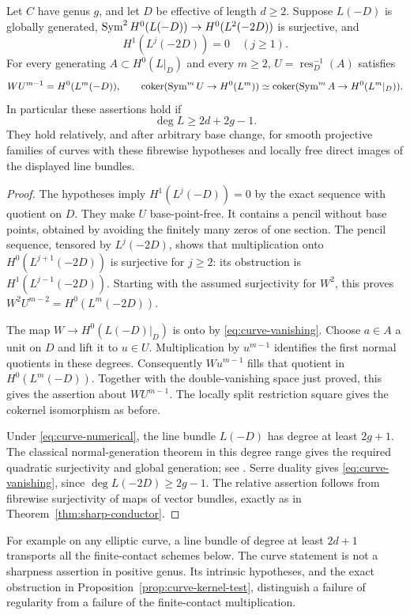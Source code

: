 \begin{theorem}\label{thm:curve-conductor}
Let $C$ have genus $g$, and let $D$ be effective of length $d\ge2$.
Suppose $L(-D)$ is globally generated,
$\operatorname{Sym}^2H^0(L(-D))\to H^0(L^2(-2D))$ is surjective, and
\begin{equation}\label{eq:curve-vanishing}
 H^1(L^j(-2D))=0\quad(j\ge1).
\end{equation}
For every generating $A\subset H^0(L|_D)$ and every $m\ge2$,
$U=\operatorname{res}_D^{-1}(A)$ satisfies
\[
 WU^{m-1}=H^0(L^m(-D)),\qquad
 \operatorname{coker}(\operatorname{Sym}^mU\to H^0(L^m))
 \simeq\operatorname{coker}(\operatorname{Sym}^mA\to H^0(L^m|_D)).
\]
In particular these assertions hold if
\begin{equation}\label{eq:curve-numerical}
 \deg L\ge2d+2g-1.
\end{equation}
They hold relatively, and after arbitrary base change, for smooth
projective families of curves with these fibrewise hypotheses and
locally free direct images of the displayed line bundles.
\end{theorem}
\begin{proof}
The hypotheses imply $H^1(L^j(-D))=0$ by the exact sequence with
quotient on $D$. They make $U$ base-point-free. It contains a pencil
without base points, obtained by avoiding the finitely many zeros of
one section. The pencil sequence, tensored by $L^j(-2D)$, shows that
multiplication onto $H^0(L^{j+1}(-2D))$ is surjective for $j\ge2$:
its obstruction is $H^1(L^{j-1}(-2D))$. Starting with the assumed
surjectivity for $W^2$, this proves
$W^2U^{m-2}=H^0(L^m(-2D))$.

The map $W\to H^0(L(-D)|_D)$ is onto by \eqref{eq:curve-vanishing}.
Choose $a\in A$ a unit on $D$ and lift it to $u\in U$.
Multiplication by $u^{m-1}$ identifies the first normal quotients in
these degrees. Consequently $Wu^{m-1}$ fills that quotient in
$H^0(L^m(-D))$. Together with the double-vanishing space just proved,
this gives the assertion about $WU^{m-1}$. The locally split
restriction square gives the cokernel isomorphism as before.

Under \eqref{eq:curve-numerical}, the line bundle $L(-D)$ has degree
at least $2g+1$. The classical normal-generation theorem in this
degree range gives the required quadratic surjectivity and global
generation; see \cite[p.~73, Introduction]{GL86}.
Serre duality gives \eqref{eq:curve-vanishing}, since
$\deg L(-2D)\ge2g-1$. The relative assertion follows from fibrewise
surjectivity of maps of vector bundles, exactly as in
Theorem~\ref{thm:sharp-conductor}.
\end{proof}

For example on any elliptic curve, a line bundle of degree at least
$2d+1$ transports all the finite-contact schemes below. The curve
statement is not a sharpness assertion in positive genus. Its
intrinsic hypotheses, and the exact obstruction in
Proposition~\ref{prop:curve-kernel-test}, distinguish a failure of
regularity from a failure of the finite-contact multiplication.
